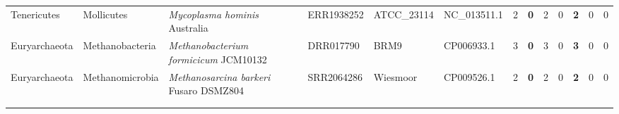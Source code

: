 \begin{sidewaystable}[!hb]
\begin{tabular}{p{2.25cm}p{2.65cm}p{5.75cm}p{1.75cm}p{2.25cm}p{1.95cm}p{.6cm}>{\hfill}p{.4cm}p{.2cm}p{.1cm}>{\hfill}p{.4cm}p{.2cm}p{.1cm}}
    Tenericutes    & Mollicutes            & \textit{Mycoplasma       hominis}      Australia                                             & ERR1938252 & ATCC\_23114  &NC\_013511.1       & 2  & \textbf{0} & 2  & 0 & \textbf{2} & 0 & 0 \\
    Euryarchaeota  & Methanobacteria       & \textit{Methanobacterium formicicum}   JCM10132                                              & DRR017790  & BRM9        &CP006933.1        & 3  & \textbf{0} & 3  & 0 & \textbf{3} & 0 & 0 \\
    Euryarchaeota  & Methanomicrobia       & \textit{Methanosarcina    barkeri}     Fusaro DSMZ804                                        & SRR2064286 & Wiesmoor    &CP009526.1        & 2  & \textbf{0} & 2  & 0 & \textbf{2} & 0 & 0 \\

    \bottomrule
    \begin{minipage}[t]{.5\textwidth}
      {\tiny
        $\checkmark$  correct assembly; --  unnassembled; $\times$  incorrect assembly\\
      }
    \end{minipage}
  \end{tabular}
\end{sidewaystable}

